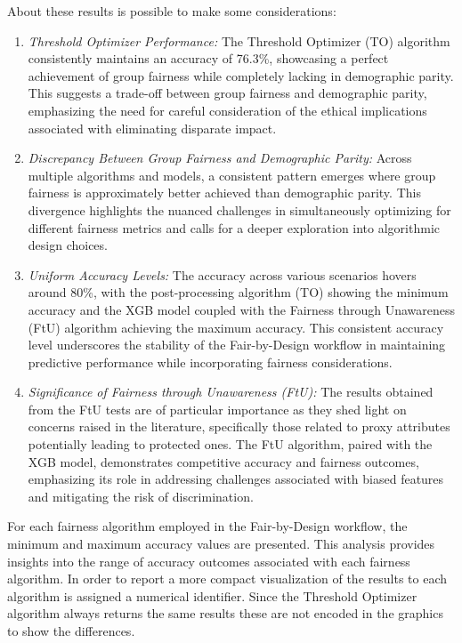 About these results is possible to make some considerations:
\begin{enumerate}
    \item \emph{Threshold Optimizer Performance:} The Threshold Optimizer (TO) algorithm consistently maintains an accuracy of 76.3\%, showcasing a perfect achievement of group fairness while completely lacking in demographic parity. This suggests a trade-off between group fairness and demographic parity, emphasizing the need for careful consideration of the ethical implications associated with eliminating disparate impact.
    
    \item \emph{Discrepancy Between Group Fairness and Demographic Parity:} Across multiple algorithms and models, a consistent pattern emerges where group fairness is approximately better achieved than demographic parity. This divergence highlights the nuanced challenges in simultaneously optimizing for different fairness metrics and calls for a deeper exploration into algorithmic design choices.
    
    \item \emph{Uniform Accuracy Levels:} The accuracy across various scenarios hovers around 80\%, with the post-processing algorithm (TO) showing the minimum accuracy and the XGB model coupled with the Fairness through Unawareness (FtU) algorithm achieving the maximum accuracy. This consistent accuracy level underscores the stability of the Fair-by-Design workflow in maintaining predictive performance while incorporating fairness considerations.
    
    \item \emph{Significance of Fairness through Unawareness (FtU):} The results obtained from the FtU tests are of particular importance as they shed light on concerns raised in the literature, specifically those related to proxy attributes potentially leading to protected ones. The FtU algorithm, paired with the XGB model, demonstrates competitive accuracy and fairness outcomes, emphasizing its role in addressing challenges associated with biased features and mitigating the risk of discrimination.
\end{enumerate}

For each fairness algorithm employed in the Fair-by-Design workflow, the minimum and maximum accuracy values are presented. This analysis provides insights into the range of accuracy outcomes associated with each fairness algorithm.
In order to report a more compact visualization of the results to each algorithm is assigned a numerical identifier. Since the Threshold Optimizer algorithm always returns the same results these are not encoded in the graphics to show the differences.

